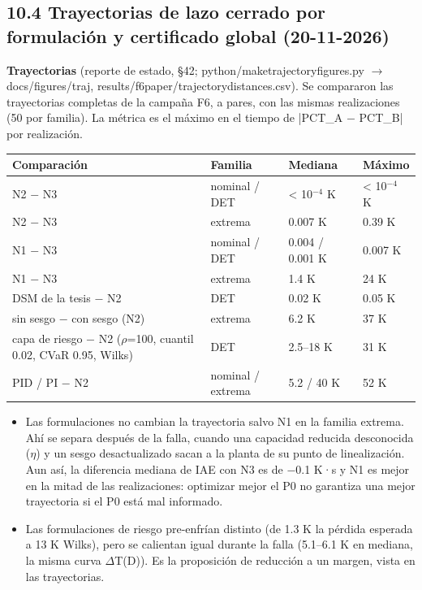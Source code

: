 \documentclass[11pt,a4paper]{article}
\newcommand{\codeus}{\textunderscore\allowbreak}
\newcommand{\code}[1]{{\small\ttfamily\let\_\codeus #1}}
\begin{document}
\subsection*{10.4 Trayectorias de lazo cerrado por formulación y certificado global (20-11-2026)}
\textbf{Trayectorias} (reporte de estado, \S{}42; \code{python/make\_trajectory\_figures.py} $\to$ \code{docs/figures/traj\_*}, \code{results/f6\_paper/trajectory\_distances.csv}). Se compararon las trayectorias completas de la campaña F6, a pares, con las mismas realizaciones (50 por familia). La métrica es el máximo en el tiempo de |PCT\_A $-$ PCT\_B| por realización.

{\footnotesize
\begin{xltabular}{\linewidth}{@{}YYYY@{}}
\toprule
\textbf{Comparación} & \textbf{Familia} & \textbf{Mediana} & \textbf{Máximo} \\
\midrule
\endhead
N2 $-$ N3 & nominal / DET & < 10$^{-4}$ K & < 10$^{-4}$ K \\
N2 $-$ N3 & extrema & 0.007 K & 0.39 K \\
N1 $-$ N3 & nominal / DET & 0.004 / 0.001 K & 0.007 K \\
N1 $-$ N3 & extrema & 1.4 K & 24 K \\
DSM de la tesis $-$ N2 & DET & 0.02 K & 0.05 K \\
sin sesgo $-$ con sesgo (N2) & extrema & 6.2 K & 37 K \\
capa de riesgo $-$ N2 ($\rho$=100, cuantil 0.02, CVaR 0.95, Wilks) & DET & 2.5–18 K & 31 K \\
PID / PI $-$ N2 & nominal / extrema & 5.2 / 40 K & 52 K \\
\bottomrule
\end{xltabular}}

\begin{itemize}
\item Las formulaciones no cambian la trayectoria salvo N1 en la familia extrema. Ahí se separa después de la falla, cuando una capacidad reducida desconocida ($\eta$) y un sesgo desactualizado sacan a la planta de su punto de linealización. Aun así, la diferencia mediana de IAE con N3 es de $-$0.1 K·s y N1 es mejor en la mitad de las realizaciones: optimizar mejor el P0 no garantiza una mejor trayectoria si el P0 está mal informado.
\item Las formulaciones de riesgo pre-enfrían distinto (de 1.3 K la pérdida esperada a 13 K Wilks), pero se calientan igual durante la falla (5.1–6.1 K en mediana, la misma curva $\Delta$T(D)). Es la proposición de reducción a un margen, vista en las trayectorias.
\end{itemize}
\end{document}
